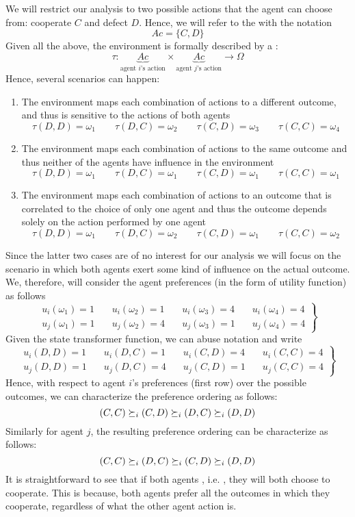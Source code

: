 	We will restrict our analysis to two possible actions that the agent can choose from: cooperate $C$ and defect $D$. Hence, we will refer to the  with the notation
	\[Ac = \{C,D\}\]
	Given all the above, the environment is formally described by a :
	\[\tau: \underbrace{Ac}_{\text{agent $i$’s action}}\times\underbrace{Ac}_{\text{agent $j$’s action}}\rightarrow \Omega\]
	Hence, several scenarios can happen:
	\begin{enumerate}
	\item The environment maps each combination of actions to a different outcome, and thus is sensitive to the actions of both agents
	\[\tau(D,D)=\omega_1\qquad\tau(D,C)=\omega_2\qquad\tau(C,D)=\omega_3\qquad\tau(C,C)=\omega_4\]
	\item The environment maps each combination of actions to the same outcome and thus neither of the agents have influence in the environment
	\[\tau(D,D)=\omega_1\qquad\tau(D,C)=\omega_1\qquad\tau(C,D)=\omega_1\qquad\tau(C,C)=\omega_1\]
	\item The environment maps each combination of actions to an outcome that is correlated to the choice of only one agent and thus the outcome depends solely on the action performed by one agent
	\[\tau(D,D)=\omega_1\qquad\tau(D,C)=\omega_2\qquad\tau(C,D)=\omega_1\qquad\tau(C,C)=\omega_2\]	
	\end{enumerate}
	Since the latter two cases are of no interest for our analysis we will focus on the scenario in which both agents exert some kind of influence on the actual outcome. We, therefore, will consider the agent preferences (in the form of utility function) as follows
	\[
	\left.
	\begin{aligned}
	u_i(\omega_1) = 1&\quad u_i(\omega_2) = 1&\quad u_i(\omega_3) = 4&\quad u_i(\omega_4) = 4\\
	u_j(\omega_1) = 1&\quad u_j(\omega_2) = 4&\quad u_j(\omega_3) = 1&\quad u_j(\omega_4) = 4
	\end{aligned}
	\right\}
	\]
	Given the state transformer function, we can abuse notation and write
	\[
	\left.
	\begin{aligned}
	u_i(D,D) = 1&\quad u_i(D,C) = 1&\quad u_i(C,D) = 4&\quad u_i(C,C) = 4\\
	u_j(D,D) = 1&\quad u_j(D,C) = 4&\quad u_j(C,D) = 1&\quad u_j(C,C) = 4
	\end{aligned}
	\right\}
	\]
	Hence, with respect to agent $i$’s preferences (first row) over the possible outcomes, we can characterize the preference ordering as follows:
	\[(C,C) \succeq_i(C,D) \succeq_i(D,C) \succeq_i(D,D) \]
	Similarly for agent $j$, the resulting preference ordering can be characterize as follows:
	\[(C,C) \succeq_i(D,C) \succeq_i(C,D) \succeq_i(D,D) \]
	It is straightforward to see that if both agents , i.e. \cite{mastxt}, they will both choose to cooperate.
	This is because, both agents prefer all the outcomes in which they cooperate, regardless of what the other agent action is.
	
